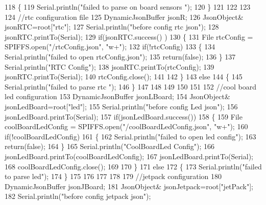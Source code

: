 \begin{DoxyCode}
118     \{
119         Serial.println(\textcolor{stringliteral}{"failed to parse on board sensors "});    
120     \}
121     
122     
123     
124     \textcolor{comment}{//rtc configuration file}
125     DynamicJsonBuffer jsonR;
126         JsonObject& jsonRTC=root[\textcolor{stringliteral}{"rtc"}];
127     Serial.println(\textcolor{stringliteral}{"before config rtc json"});
128     jsonRTC.printTo(Serial);
129     \textcolor{keywordflow}{if}(jsonRTC.success() )
130     \{
131         File rtcConfig = SPIFFS.open(\textcolor{stringliteral}{"/rtcConfig.json"}, \textcolor{stringliteral}{"w+"});  
132         \textcolor{keywordflow}{if}(!rtcConfig)
133         \{
134             Serial.println(\textcolor{stringliteral}{"failed to open rtcConfig.json"});
135             \textcolor{keywordflow}{return}(\textcolor{keyword}{false});
136         \}
137         Serial.println(\textcolor{stringliteral}{"RTC Config"});
138         jsonRTC.printTo(rtcConfig);
139         jsonRTC.printTo(Serial);
140         rtcConfig.close();
141     
142     \}
143     \textcolor{keywordflow}{else}
144     \{
145         Serial.println(\textcolor{stringliteral}{"failed to parse rtc "});
146     \}
147 
148     
149     
150     
151     
152         \textcolor{comment}{//cool board led configuration}
153     DynamicJsonBuffer jsonLBoard;
154         JsonObject& jsonLedBoard=root[\textcolor{stringliteral}{"led"}];
155     Serial.println(\textcolor{stringliteral}{"before config Led json"});
156     jsonLedBoard.printTo(Serial);
157     \textcolor{keywordflow}{if}(jsonLedBoard.success())
158     \{   
159         File coolBoardLedConfig = SPIFFS.open(\textcolor{stringliteral}{"/coolBoardLedConfig.json"}, \textcolor{stringliteral}{"w+"});    
160         \textcolor{keywordflow}{if}(!coolBoardLedConfig)
161         \{
162             Serial.println(\textcolor{stringliteral}{"failed to open led config"});
163             \textcolor{keywordflow}{return}(\textcolor{keyword}{false});
164         \}
165         Serial.println(\textcolor{stringliteral}{"CoolBoardLed Config"});
166         jsonLedBoard.printTo(coolBoardLedConfig);
167         jsonLedBoard.printTo(Serial);
168         coolBoardLedConfig.close();
169     
170     \}
171     \textcolor{keywordflow}{else}
172     \{
173         Serial.println(\textcolor{stringliteral}{"failed to parse led"});
174     \}
175         
176 
177     
178 
179     \textcolor{comment}{//jetpack configuration}
180     DynamicJsonBuffer jsonJBoard;
181         JsonObject& jsonJetpack=root[\textcolor{stringliteral}{"jetPack"}];
182     Serial.println(\textcolor{stringliteral}{"before config jetpack json"});

\end{DoxyCode}
